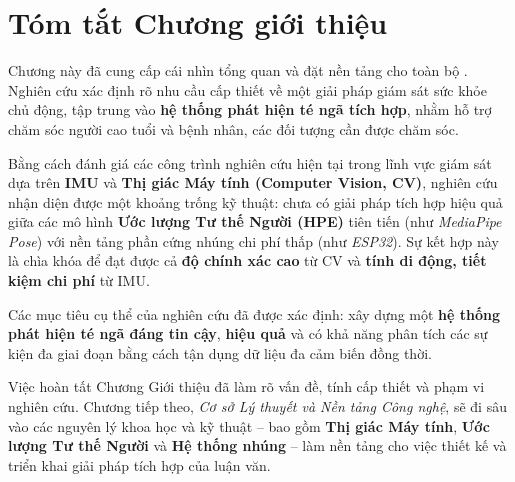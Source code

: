 
\section{Tóm tắt Chương giới thiệu}
\label{sec:chapter1_conclusion}

Chương này đã cung cấp cái nhìn tổng quan và đặt nền tảng cho toàn bộ \TENLUANVAN. Nghiên cứu xác định rõ nhu cầu cấp thiết về một giải pháp giám sát sức khỏe chủ động, tập trung vào \textbf{hệ thống phát hiện té ngã tích hợp}, nhằm hỗ trợ chăm sóc người cao tuổi và bệnh nhân, các đối tượng cần được chăm sóc.

Bằng cách đánh giá các công trình nghiên cứu hiện tại trong lĩnh vực giám sát dựa trên \textbf{IMU} và \textbf{Thị giác Máy tính (Computer Vision, CV)}, nghiên cứu nhận diện được một khoảng trống kỹ thuật: chưa có giải pháp tích hợp hiệu quả giữa các mô hình \textbf{Ước lượng Tư thế Người (HPE)} tiên tiến (như \textit{MediaPipe Pose}) với nền tảng phần cứng nhúng chi phí thấp (như \textit{ESP32}). Sự kết hợp này là chìa khóa để đạt được cả \textbf{độ chính xác cao} từ CV và \textbf{tính di động, tiết kiệm chi phí} từ IMU.

Các mục tiêu cụ thể của nghiên cứu đã được xác định: xây dựng một \textbf{hệ thống phát hiện té ngã đáng tin cậy}, \textbf{hiệu quả} và có khả năng phân tích các sự kiện đa giai đoạn bằng cách tận dụng dữ liệu đa cảm biến đồng thời.

Việc hoàn tất Chương Giới thiệu đã làm rõ vấn đề, tính cấp thiết và phạm vi nghiên cứu. Chương tiếp theo, \textit{Cơ sở Lý thuyết và Nền tảng Công nghệ}, sẽ đi sâu vào các nguyên lý khoa học và kỹ thuật – bao gồm \textbf{Thị giác Máy tính}, \textbf{Ước lượng Tư thế Người} và \textbf{Hệ thống nhúng} – làm nền tảng cho việc thiết kế và triển khai giải pháp tích hợp của luận văn.
